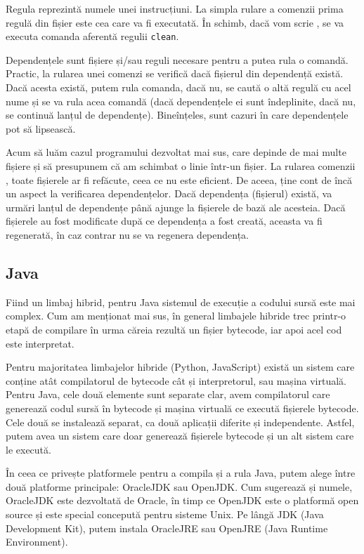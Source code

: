 Regula reprezintă numele unei instrucțiuni.
La simpla rulare a comenzii  prima regulă din fișier este cea care va fi executată.
În schimb, dacă vom scrie , se va executa comanda aferentă regulii \texttt{clean}.

Dependențele sunt fișiere și/sau reguli necesare pentru a putea rula o comandă.
Practic, la rularea unei comenzi se verifică dacă fișierul din dependență există.
Dacă acesta există, putem rula comanda, dacă nu, se caută o altă regulă cu acel nume și se va rula acea comandă (dacă dependențele ei sunt îndeplinite, dacă nu, se continuă lanțul de dependențe).
Bineînțeles, sunt cazuri în care dependențele pot să lipsească.

Acum să luăm cazul programului dezvoltat mai sus, care depinde de mai multe fișiere și să presupunem că am schimbat o linie într-un fișier.
La rularea comenzii , toate fișierele ar fi refăcute, ceea ce nu este eficient.
De aceea,  ține cont de încă un aspect la verificarea dependențelor.
Dacă dependența (fișierul) există,  va urmări lanțul de dependențe până ajunge la fișierele de bază ale acesteia.
Dacă fișierele au fost modificate după ce dependența a fost creată, aceasta va fi regenerată, în caz contrar nu se va regenera dependența.

\subsection{Java}
\label{sec:appdev:dev-env:java}

Fiind un limbaj hibrid, pentru Java sistemul de execuție a codului sursă este mai complex.
Cum am menționat mai sus, în general limbajele hibride trec printr-o etapă de compilare în urma căreia rezultă un fișier bytecode, iar apoi acel cod este interpretat.

Pentru majoritatea limbajelor hibride (Python, JavaScript) există un sistem care conține atât compilatorul de bytecode cât și interpretorul, sau mașina virtuală.
Pentru Java, cele două elemente sunt separate clar, avem compilatorul care generează codul sursă în bytecode și mașina virtuală ce execută fișierele bytecode.
Cele două se instalează separat, ca două aplicații diferite și independente.
Astfel, putem avea un sistem care doar generează fișierele bytecode și un alt sistem care le execută.

În ceea ce privește platformele pentru a compila și a rula Java, putem alege între două platforme principale: OracleJDK sau OpenJDK.
Cum sugerează și numele, OracleJDK este dezvoltată de Oracle, în timp ce OpenJDK este o platformă open source și este special concepută pentru sisteme Unix.
Pe lângă JDK (Java Development Kit), putem instala OracleJRE sau OpenJRE (Java Runtime Environment).

